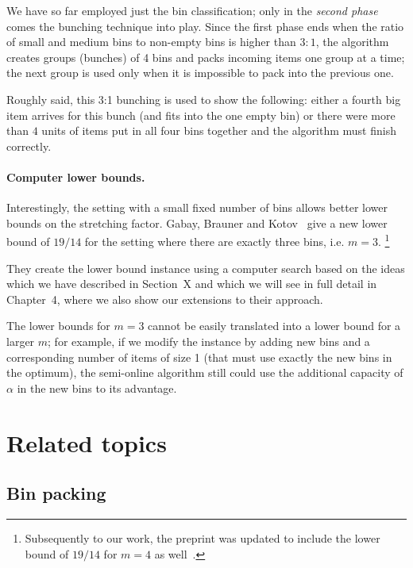 We have so far employed just the bin classification; only in the
\emph{second phase} comes the bunching technique into play. Since the
first phase ends when the ratio of small and medium bins to non-empty
bins is higher than $3:1$, the algorithm creates groups (bunches) of 4
bins and packs incoming items one group at a time; the next group is
used only when it is impossible to pack into the previous one.

Roughly said, this 3:1 bunching is used to show the following: either
a fourth big item arrives for this bunch (and fits into the one empty
bin) or there were more than $4$ units of items put in all four bins
together and the algorithm must finish correctly.


\paragraph{Computer lower bounds.} Interestingly, the setting with a
small fixed number of bins allows better lower bounds on the
stretching factor. Gabay, Brauner and Kotov~\cite{gabay2013lbv2} give
a new lower bound of $19/14$ for the setting where there are exactly
three bins, i.e. $m=3$. \footnote{Subsequently to our work, the
preprint \cite{gabay2013lbv2} was updated to include the lower bound
of $19/14$ for $m=4$ as well~\cite{gabay2013lbv3}.}

They create the lower bound instance using a computer search based on
the ideas which we have described in Section~X and which we will see
in full detail in Chapter~4, where we also show our extensions to
their approach.

The lower bounds for $m=3$ cannot be easily translated into a lower
bound for a larger $m$; for example, if we modify the instance by
adding new bins and a corresponding number of items of size 1 (that
must use exactly the new bins in the optimum), the semi-online
algorithm still could use the additional capacity of $\alpha$ in the
new bins to its advantage.

\section{Related topics}\label{sec:1:related}

\subsection{Bin packing}\label{sec:1:binpackinghistory}

